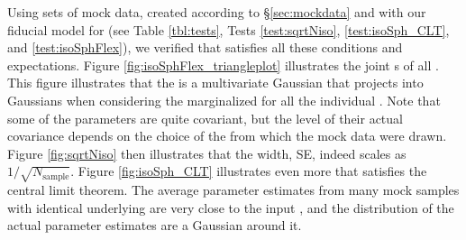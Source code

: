 Using sets of mock data, created according to \S\ref{sec:mockdata} and with our fiducial model for \pmodel{} (see Table \ref{tbl:tests}, Tests \ref{test:sqrtNiso}, \ref{test:isoSph_CLT}, and \ref{test:isoSphFlex}), we verified that \RM{} satisfies all these conditions and expectations. Figure \ref{fig:isoSphFlex_triangleplot} illustrates the joint \pdf{}s of all \pmodel{}. This figure illustrates that the \pdf{} is a multivariate Gaussian that projects into Gaussians when considering the marginalized \pdf{} for all the individual \pmodel{}. Note that some of the parameters are quite covariant, but the level of their actual covariance depends on the choice of the \pmodel{} from which the mock data were drawn. Figure \ref{fig:sqrtNiso} then illustrates that the \pdf{} width, SE, indeed scales as $1/\sqrt{N_\text{sample}}$. Figure \ref{fig:isoSph_CLT} illustrates even more that \RM{} satisfies the central limit theorem. The average parameter estimates from many mock samples with identical underlying \pmodel{} are very close to the input \pmodel{}, and the distribution of the actual parameter estimates are a Gaussian around it. 
%
%
%
